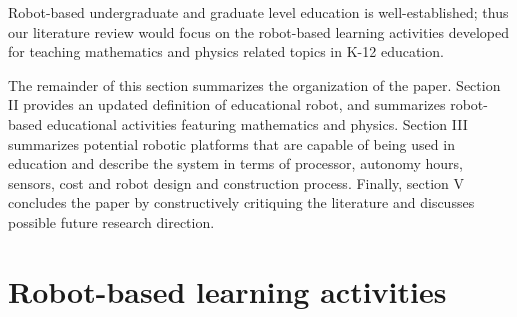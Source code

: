 \documentclass[conference]{IEEEtran}
\begin{document}
Robot-based undergraduate and graduate level education is well-established; thus our literature review would focus on 
the robot-based learning activities developed for teaching mathematics and physics related topics in K-12 education.

The remainder of this section summarizes the organization of the paper. Section II provides an updated definition of 
educational robot, and summarizes robot-based educational activities featuring mathematics and physics. Section III 
summarizes potential robotic platforms that are capable of being used in education and describe the system in terms 
of processor, autonomy hours, sensors, cost and robot design and construction process. Finally, section V concludes the paper by constructively 
critiquing the literature and discusses possible future research direction.

\section{Robot-based learning activities}
\end{document}

